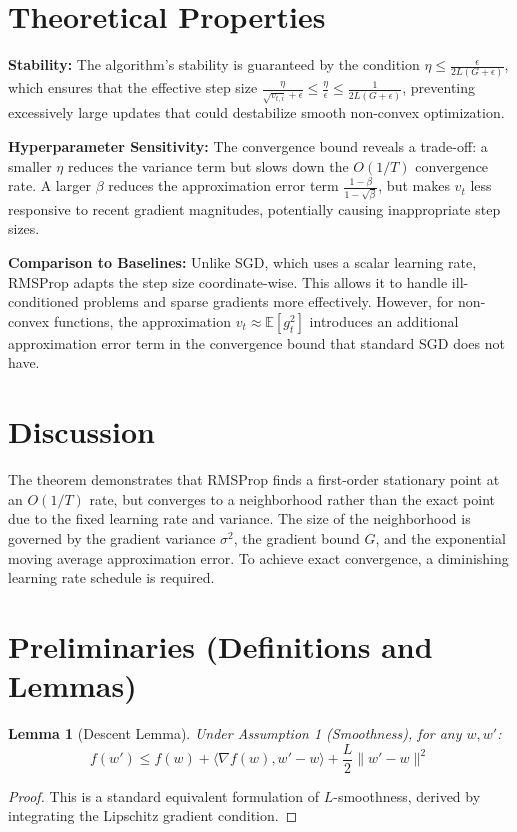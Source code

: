 \documentclass{article}
\newtheorem{lemma}[theorem]{Lemma}
\begin{document}
\section*{Theoretical Properties}
\textbf{Stability:} The algorithm's stability is guaranteed by the condition $\eta \leq \frac{\epsilon}{2L(G+\epsilon)}$, which ensures that the effective step size $\frac{\eta}{\sqrt{v_{t,i}}+\epsilon} \leq \frac{\eta}{\epsilon} \leq \frac{1}{2L(G+\epsilon)}$, preventing excessively large updates that could destabilize smooth non-convex optimization.

\textbf{Hyperparameter Sensitivity:} The convergence bound reveals a trade-off: a smaller $\eta$ reduces the variance term but slows down the $O(1/T)$ convergence rate. A larger $\beta$ reduces the approximation error term $\frac{1-\beta}{1-\sqrt{\beta}}$, but makes $v_t$ less responsive to recent gradient magnitudes, potentially causing inappropriate step sizes.

\textbf{Comparison to Baselines:} Unlike SGD, which uses a scalar learning rate, RMSProp adapts the step size coordinate-wise. This allows it to handle ill-conditioned problems and sparse gradients more effectively. However, for non-convex functions, the approximation $v_t \approx \mathbb{E}[g_t^2]$ introduces an additional approximation error term in the convergence bound that standard SGD does not have.

\section*{Discussion}
The theorem demonstrates that RMSProp finds a first-order stationary point at an $O(1/T)$ rate, but converges to a neighborhood rather than the exact point due to the fixed learning rate and variance. The size of the neighborhood is governed by the gradient variance $\sigma^2$, the gradient bound $G$, and the exponential moving average approximation error. To achieve exact convergence, a diminishing learning rate schedule is required.

\newpage
\section*{Preliminaries (Definitions and Lemmas)}
\begin{lemma}[Descent Lemma]
Under Assumption 1 (Smoothness), for any $w, w'$:
$$ f(w') \leq f(w) + \langle \nabla f(w), w' - w \rangle + \frac{L}{2} \|w' - w\|^2 $$
\end{lemma}
\begin{proof}
This is a standard equivalent formulation of $L$-smoothness, derived by integrating the Lipschitz gradient condition.
\end{proof}
\end{document}
